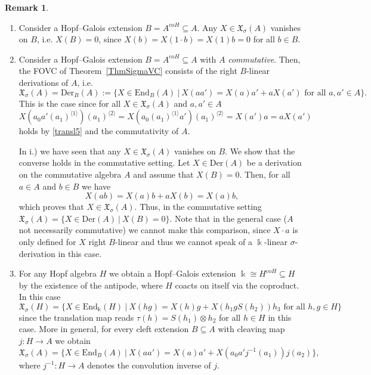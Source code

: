 \documentclass{article}
\theoremstyle{definition}
\newtheorem{remark}[thm]{Remark}
\begin{document}
	\begin{remark}
		\begin{enumerate}
			\item[i.)] Consider a Hopf--Galois extension $B=A^{\mathrm{co}H}\subseteq A$. Any $X\in\mathfrak{X}_\sigma(A)$ vanishes on $B$, i.e.
			$X(B)=0$, since $X(b)=X(1\cdot b)=X(1)b=0$ for all $b\in B$. 
			
			\item[ii.)] Consider a Hopf--Galois extension $B=A^{\mathrm{co}H}\subseteq A$ with $A$ \textit{commutative}. Then, the FOVC of Theorem~\ref{ThmSigmaVC} consists of the right $B$-linear derivations of $A$, i.e. 
			$$
			\mathfrak{X}_\sigma(A)=\mathrm{Der}_B(A):=\{X\in\mathrm{End}_B(A)~|~X(aa')=X(a)a'+aX(a')\text{ for all }a,a'\in A\}.
			$$
			This is the case since for all $X\in\mathfrak{X}_\sigma(A)$ and $a,a'\in A$
			$$
			X(a_0a'(a_1)^{\langle 1\rangle})(a_1)^{\langle 2\rangle}=X(a_0(a_1)^{\langle 1\rangle}a')(a_1)^{\langle 2\rangle}=X(a')a=aX(a')
			$$
			holds by \eqref{transl5} and the commutativity of $A$.
			
			In i.) we have seen that any $X\in\mathfrak{X}_\sigma(A)$ vanishes on $B$. We show that the converse holds in the commutative setting. Let $X\in\mathrm{Der}(A)$ be a derivation on the commutative algebra $A$ and assume that $X(B)=0$. Then, for all $a\in A$ and $b\in B$ we have
			$$
			X(ab)=X(a)b+aX(b)=X(a)b,
			$$
			which proves that $X\in\mathfrak{X}_\sigma(A)$. Thus, in the commutative setting $\mathfrak{X}_\sigma(A)=\{X\in\mathrm{Der}(A)~|~X(B)=0\}$. Note that in the general case ($A$ not necessarily commutative) we cannot make this comparison, since $X\cdot a$ is only defined for $X$ right $B$-linear and thus we cannot speak of a $\Bbbk$-linear $\sigma$-derivation in this case.
			
			\item[iii.)] For any Hopf algebra $H$ we obtain a Hopf--Galois extension $\Bbbk\cong H^{\mathrm{co}H}\subseteq H$ by the existence of the antipode, where $H$ coacts on itself via the coproduct. In this case
			$$
			\mathfrak{X}_\sigma(H)=\{X\in\mathrm{End}_\Bbbk(H)~|~X(hg)=X(h)g+X(h_1gS(h_2))h_3\text{ for all }h,g\in H\}
			$$
			since the translation map reads $\tau(h)=S(h_1)\otimes h_2$ for all $h\in H$ in this case. More in general, for every cleft extension $B\subseteq A$ with cleaving map $j\colon H\to A$ we obtain
			$$
			\mathfrak{X}_\sigma(A)=\{X\in\mathrm{End}_B(A)~|~X(aa')=X(a)a'+X(a_0a'j^{-1}(a_1))j(a_2)\},
			$$
			where $j^{-1}\colon H\to A$ denotes the convolution inverse of $j$.
		\end{enumerate}
	\end{remark}
	
\end{document}
